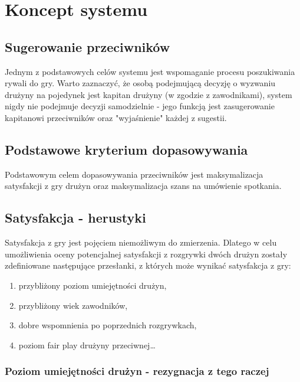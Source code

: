 \documentclass[a4paper,11pt]{article}
\begin{document}
\tableofcontents
\newpage

\section{Koncept systemu}

\subsection{Sugerowanie przeciwników}

Jednym z podstawowych celów systemu jest wspomaganie procesu poszukiwania rywali do gry. Warto zaznaczyć, że osobą podejmującą decyzję o wyzwaniu drużyny na pojedynek jest kapitan drużyny (w zgodzie z zawodnikami), system nigdy nie podejmuje decyzji samodzielnie - jego funkcją jest zasugerowanie kapitanowi przeciwników oraz "wyjaśnienie" każdej z sugestii.

\subsection{Podstawowe kryterium dopasowywania}

Podstawowym celem dopasowywania przeciwników jest maksymalizacja satysfakcji z gry drużyn oraz maksymalizacja szans na umówienie spotkania.

\subsection{Satysfakcja - herustyki}

Satysfakcja z gry jest pojęciem niemożliwym do zmierzenia. Dlatego w celu umożliwienia oceny potencjalnej satysfakcji z rozgrywki dwóch drużyn zostały zdefiniowane następujące przesłanki, z których może wynikać satysfakcja z gry:

\begin{enumerate}
\item przybliżony poziom umiejętności drużyn,
\item przybliżony wiek zawodników,
\item dobre wspomnienia po poprzednich rozgrywkach,
\item poziom fair play drużyny przeciwnej\ldots
\end{enumerate}


\subsubsection{Poziom umiejętności drużyn - rezygnacja z tego raczej}
\end{document}
